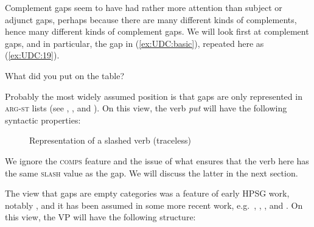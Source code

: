 \documentclass[output=paper
,notxmath 
 	        ,biblatex
                ,babelshorthands
                ,newtxmath
                ,draftmode
                ,colorlinks, citecolor=brown
]{langscibook}
\begin{document}
Complement gaps seem to have had rather more attention than subject or
adjunct gaps, perhaps because there are many different kinds of
complements, hence many different kinds of complement gaps. We will look
first at complement gaps, and in particular, the gap in (\ref{ex:UDC:basic}), repeated
here as (\ref{ex:UDC:19}).

\begin{exe}
\ex \label{ex:UDC:19}
What did you put \trace{} on the table?
\end{exe}

\noindent
Probably the most widely assumed position is that gaps are only
represented in \textsc{arg-st} lists
(see \citealt[Section~4.1]{Sag:97},
\citealt*[Section~2.2]{Bouma:Malouf:Sag:01},
\citealt[Chapter~5.1]{Ginzburg:Sag:01} and \citealt[508]{Sag:10a}). On
this view, the verb \textit{put} will have the
following syntactic properties:

\begin{figure}
\centering

   \caption{\label{fig:UDC:20}Representation of a slashed verb (traceless)}
\end{figure}


\noindent
We ignore the \textsc{comps} feature and the issue of what ensures that the verb
here has the same \textsc{slash} value as the gap. We will discuss the latter in
the next section.

The view that gaps are empty categories was a feature of early HPSG
work, notably \citet[Chapter~4]{Pollard:Sag:94}, and it has been assumed in some
more recent work, e.g.\ \citet[191,385]{Levine:Hukari:06}, \citet{Borsley:09a},
\citet[Section~4.2]{Borsley:13}, and \citet{Mueller:14b}. On
this view, the VP will have the following structure:
\end{document}
